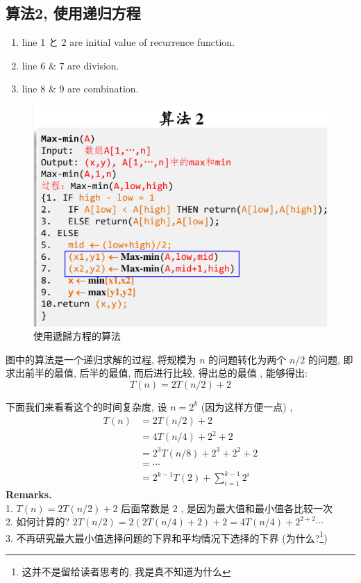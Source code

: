 \documentclass[a4paper, 10pt]{ctexart} %
\begin{document}
\subsection{算法2, 使用递归方程}
\begin{enumerate}
    \item line 1 と 2 are initial value of recurrence function. 
    \item line 6 \& 7 are division. 
    \item line 8 \& 9 are combination.
\end{enumerate}
\begin{figure}[H]
    \centering
    \includegraphics*[scale = 0.3]{2.png}\caption{使用遞歸方程的算法}
\end{figure}

图中的算法是一个递归求解的过程, 将规模为 $n$ 的问题转化为两个 $n / 2$ 的问题, 
即求出前半的最值, 后半的最值, 而后进行比较, 得出总的最值
, 能够得出:
\[
T\left(n\right) = 2 T\left(n /2\right) + 2
\]

下面我们来看看这个的时间复杂度, 设 $n = 2 ^{k}$
(因为这样方便一点) , 
\[
\begin{aligned}
    T\left(n \right)& = 2  T\left(n /2\right) +2 \\
    & = 4 T\left(n / 4\right) + 2 ^{2} +2 \\
    & = 2 ^{3}T\left(n / 8\right) + 2 ^{3} + 2 ^{2} +2 \\
    & = \cdots \\
    & = 2^{k-1} T\left(2\right) + \sum_{i=1} ^{k-1} 2 ^{i}
\end{aligned}
\]
\noindent \textbf{Remarks.} \\
1. $T\left(n\right) = 2 T\left( n /2\right) + 2$ 
后面常数是   $2$ , 是因为最大值和最小值各比较一次\\ 
2. 如何计算的? $2 T\left(n /2 \right) = 
2\left(2 T\left( n /4\right) + 2\right) + 2 
= 4 T\left( n / 4\right) + 2 ^{2 +2} \cdots$\\
3. 不再研究最大最小值选择问题的下界和平均情况下选择的下界 
(为什么?\footnote{这并不是留给读者思考的, 我是真不知道为什么})
\end{document}

